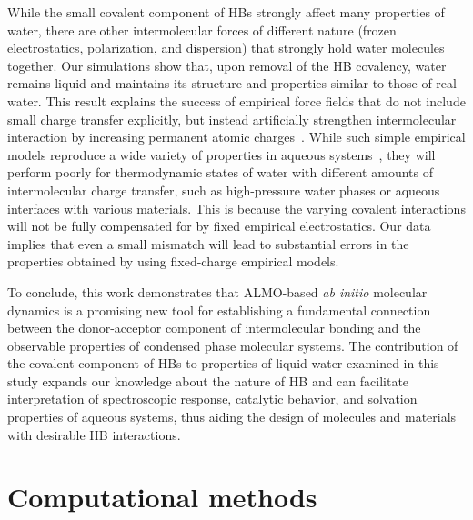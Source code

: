 \documentclass[journal=jacsat,manuscript=article]{achemso}
\begin{document}
While the small covalent component of HBs strongly affect many properties of water, there are other intermolecular forces of different nature (frozen electrostatics, polarization, and dispersion) that strongly hold water molecules together. 
Our simulations show that, upon removal of the HB covalency, water remains liquid and maintains its structure and properties similar to those of real water. 
This result explains the success of empirical force fields that do not include small charge transfer explicitly, but instead artificially strengthen intermolecular interaction by increasing permanent atomic charges~\cite{rick2016polarizable}. 
While such simple empirical models reproduce a wide variety of properties in aqueous systems~\cite{vega2011simulating}, they will perform poorly for thermodynamic states of water with different amounts of intermolecular charge transfer, such as high-pressure water phases or aqueous interfaces with various materials. 
This is because the varying covalent interactions will not be fully compensated for by fixed empirical electrostatics.
Our data implies that even a small mismatch will lead to substantial errors in the properties obtained by using fixed-charge empirical models.

To conclude, this work demonstrates that ALMO-based \emph{ab initio} molecular dynamics is a promising new tool for establishing a fundamental connection between the donor-acceptor component of intermolecular bonding and the observable properties of condensed phase molecular systems. 
The contribution of the covalent component of HBs to properties of liquid water examined in this study expands our knowledge about the nature of HB and can facilitate interpretation of spectroscopic response, catalytic behavior, and solvation properties of aqueous systems, thus aiding the design of molecules and materials with desirable HB interactions. 
 
\section{Computational methods}
\end{document}
